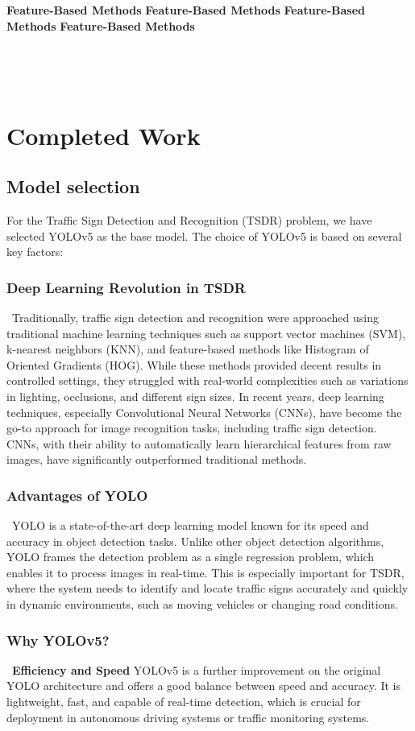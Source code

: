 \documentclass[letterpaper, 10 pt, conference]{ieeeconf}
\begin{document}
\textbf{Feature-Based Methods}
\textbf{Feature-Based Methods}
\textbf{Feature-Based Methods}
\textbf{Feature-Based Methods}

\

\
\section{Completed Work}
\hrulefill

\subsection{Model selection}

For the Traffic Sign Detection and Recognition (TSDR) problem, we have selected YOLOv5 as the base model. The choice of YOLOv5 is based on several key factors:

\subsubsection{Deep Learning Revolution in TSDR}\
Traditionally, traffic sign detection and recognition were approached using traditional machine learning techniques such as support vector machines (SVM), k-nearest neighbors (KNN), and feature-based methods like Histogram of Oriented Gradients (HOG). While these methods provided decent results in controlled settings, they struggled with real-world complexities such as variations in lighting, occlusions, and different sign sizes. In recent years, deep learning techniques, especially Convolutional Neural Networks (CNNs), have become the go-to approach for image recognition tasks, including traffic sign detection. CNNs, with their ability to automatically learn hierarchical features from raw images, have significantly outperformed traditional methods.

\subsubsection{Advantages of YOLO}\
YOLO is a state-of-the-art deep learning model known for its speed and accuracy in object detection tasks. Unlike other object detection algorithms, YOLO frames the detection problem as a single regression problem, which enables it to process images in real-time. This is especially important for TSDR, where the system needs to identify and locate traffic signs accurately and quickly in dynamic environments, such as moving vehicles or changing road conditions.

\subsubsection{Why YOLOv5?}\
\textbf{Efficiency and Speed}
YOLOv5 is a further improvement on the original YOLO architecture and offers a good balance between speed and accuracy. It is lightweight, fast, and capable of real-time detection, which is crucial for deployment in autonomous driving systems or traffic monitoring systems.
\end{document}
